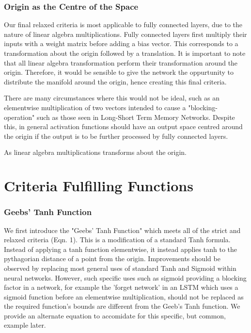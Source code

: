 \documentclass[onecolumn]{article}
\begin{document}
    \subsubsection{Origin as the Centre of the Space}
        
    Our final relaxed criteria is most applicable to fully connected layers, due to the nature of linear algebra multiplications. Fully connected layers first multiply their inputs with a weight matrix before adding a bias vector. This corresponds to a transformation about the origin followed by a translation. It is important to note that all linear algebra transformation perform their transformation around the origin. Therefore, it would be sensible to give the network the oppurtunity to distribute the manifold around the origin, hence creating this final criteria.
    
    There are many circumstances where this would not be ideal, such as an elementwise multiplication of two vectors intended to cause a "blocking-operation" such as those seen in Long-Short Term Memory Networks. Despite this, in general activation functions should have an output space centred around the origin if the output is to be further processed by fully connected layers.
    
    As linear algebra multiplications transforms about the origin.
       
    \section{Criteria Fulfilling Functions}
    \subsubsection{Geebs' Tanh Function}
    
    We first introduce the "Geebs' Tanh Function" which meets all of the strict and relaxed criteria (Eqn. 1). This is a modification of a standard Tanh formula. Instead of applying a tanh function elementwise, it instead applies tanh to the pythagorian distance of a point from the origin. Improvements should be observed by replacing most general uses of standard Tanh and Sigmoid within neural networks. However, such specific uses such as sigmoid providing a blocking factor in a network, for example the 'forget network' in an LSTM which uses a sigmoid function before an elementwise multiplication, should not be replaced as the required function's bounds are different from the Geeb's Tanh function. We provide an alternate equation to accomidate for this specific, but common, example later.
\end{document}
